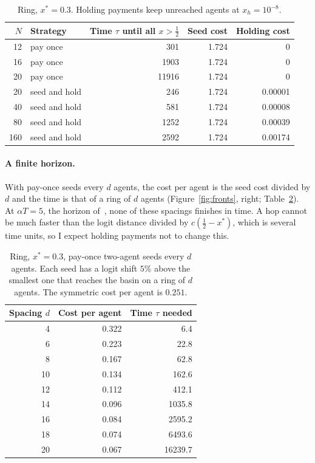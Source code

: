 \documentclass[11pt,a4paper]{article}
\theoremstyle{definition}
\theoremstyle{plain}
\newcommand{\xs}{x^{*}}
\begin{document}
\begin{table}[H]
\centering\small
\begin{tabular}{rlrrr}
\toprule
$N$ & Strategy & Time $\tau$ until all $x>\tfrac12$ & Seed cost & Holding cost\\
\midrule
12 & pay once & 301 & 1.724 & 0\\
16 & pay once & 1903 & 1.724 & 0\\
20 & pay once & 11916 & 1.724 & 0\\
20 & seed and hold & 246 & 1.724 & 0.00001\\
40 & seed and hold & 581 & 1.724 & 0.00008\\
80 & seed and hold & 1252 & 1.724 & 0.00039\\
160 & seed and hold & 2592 & 1.724 & 0.00174\\
\bottomrule
\end{tabular}
\caption{Ring, $\xs=0.3$. Holding payments keep unreached agents at $x_h=10^{-8}$.}\label{tab:hold}
\end{table}

\paragraph{A finite horizon.}
With pay-once seeds every $d$ agents, the cost per agent is the seed cost divided by $d$ and the time is that of a ring of $d$ agents (Figure~\ref{fig:fronts}, right; Table~\ref{tab:cell}). At $\alpha T=5$, the horizon of~\cite{huang2025}, none of these spacings finishes in time. A hop cannot be much faster than the logit distance divided by $c(\tfrac12-\xs)$, which is several time units, so I expect holding payments not to change this.

\begin{table}[H]
\centering\small
\begin{tabular}{rrr}
\toprule
Spacing $d$ & Cost per agent & Time $\tau$ needed\\
\midrule
4 & 0.322 & 6.4\\
6 & 0.223 & 22.8\\
8 & 0.167 & 62.8\\
10 & 0.134 & 162.6\\
12 & 0.112 & 412.1\\
14 & 0.096 & 1035.8\\
16 & 0.084 & 2595.2\\
18 & 0.074 & 6493.6\\
20 & 0.067 & 16239.7\\
\bottomrule
\end{tabular}
\caption{Ring, $\xs=0.3$, pay-once two-agent seeds every $d$ agents. Each seed has a logit shift $5\%$ above the smallest one that reaches the basin on a ring of $d$ agents. The symmetric cost per agent is $0.251$.}\label{tab:cell}
\end{table}
\end{document}
